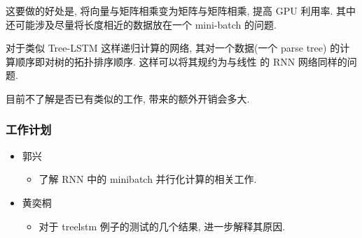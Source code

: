 \begin{itemize}
\begin{itemize}
			这要做的好处是, 将向量与矩阵相乘变为矩阵与矩阵相乘, 提高 GPU
			利用率. 其中还可能涉及尽量将长度相近的数据放在一个 mini-batch
			的问题.

			对于类似 Tree-LSTM 这样递归计算的网络, 其对一个数据(一个 parse
			tree) 的计算顺序即对树的拓扑排序顺序. 这样可以将其规约为与线性
			的 RNN 网络同样的问题.

			目前不了解是否已有类似的工作, 带来的额外开销会多大.

	      \end{itemize}
\end{itemize}

\subsubsection{工作计划}

\begin{itemize}
	\item
	      郭兴
	      \begin{itemize}
			 \item
		            了解 RNN 中的 minibatch 并行化计算的相关工作.
	      \end{itemize}
	\item
	      黄奕桐
	      \begin{itemize}
		      \item
		            对于 treelstm 例子的测试的几个结果, 进一步解释其原因.
	      \end{itemize}
\end{itemize}



